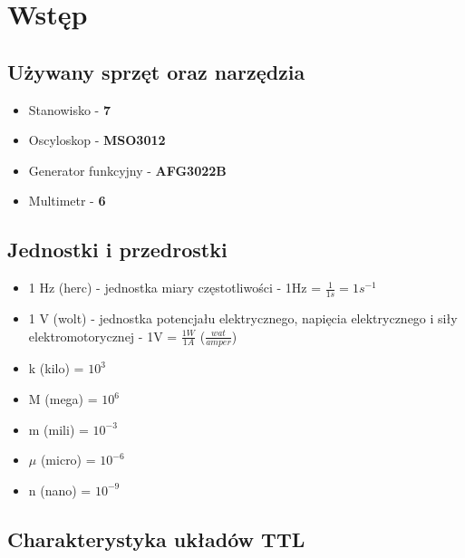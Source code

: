 \chapter{Wstęp}

\section{Używany sprzęt oraz narzędzia}

\begin{itemize}
    \item Stanowisko - \textbf{7}
    \item Oscyloskop - \textbf{MSO3012}
    \item Generator funkcyjny - \textbf{AFG3022B}
    \item Multimetr - \textbf{6}
\end{itemize}

\section{Jednostki i przedrostki}

\begin{itemize}
    \item 1 Hz (herc) - jednostka miary częstotliwości - 1Hz = $\frac{1}{1s} = 1s^{-1}$
    \item 1 V (wolt) - jednostka potencjału elektrycznego, napięcia elektrycznego i siły elektromotorycznej - 1V = $\frac{1W}{1A}$ ($\frac{wat}{amper}$)
\end{itemize}

\begin{itemize}
    \item k (kilo) = $10^3$
    \item M (mega) = $10^6$
    \item m (mili) = $10^{-3}$
    \item $\mu$ (micro) = $10^{-6}$
    \item n (nano) = $10^{-9}$
\end{itemize}

\section{Charakterystyka układów TTL}
\label{TTL:charakterystyka}

